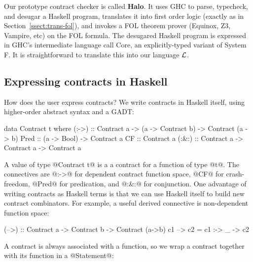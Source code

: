 Our prototype contract checker is called \textbf{Halo}.
It uses GHC to parse, typecheck, and desugar a Haskell program, 
translates it into first order logic (exactly as in Section~\ref{ssect:trans-fol}), and
invokes a FOL theorem prover (Equinox, Z3, Vampire, etc) on the FOL formula.
The desugared Haskell program is expressed in GHC's intermediate language
call Core, an explicitly-typed variant of System F.  It is straightforward
to translate this into our language $\cal L$.

\subsection{Expressing contracts in Haskell}

How does the user express contracts?  We write contracts in Haskell
itself, using higher-order abstract syntax and a GADT:
\begin{code}
data Contract t where
  (:->) :: Contract a -> (a -> Contract b) ->
           Contract (a -> b)
  Pred  :: (a -> Bool) -> Contract a
  CF    :: Contract a
  (:&:) :: Contract a -> Contract a -> Contract a
\end{code}
A value of type @Contract t@ is a 
a contract for a function of type @t@.
The connectives are @:->@ for dependent contract function space, @CF@
for crash-freedom, @Pred@ for predication, and
@:&:@ for conjunction. 
One advantage of writing contracts as Haskell terms is that
we can use Haskell itself to build new contract combinators.
For example, a useful derived connective is non-dependent function space:
\par {\small
\begin{code}
(-->) :: Contract a -> Contract b -> Contract (a->b)
c1 --> c2 = c1 :-> \_ -> c2
\end{code}
} \par
%
%

A contract is always associated with a function, so we wrap a contract
together with its function in a @Statement@:

